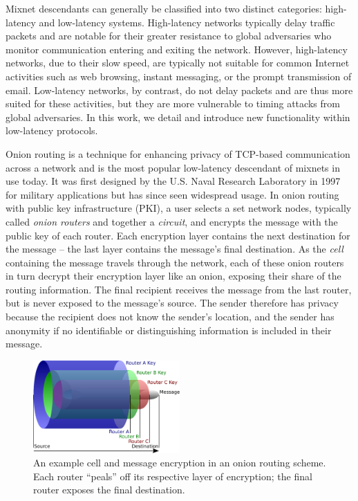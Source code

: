 Mixnet descendants can generally be classified into two distinct categories: high-latency and low-latency systems. High-latency networks typically delay traffic packets and are notable for their greater resistance to global adversaries who monitor communication entering and exiting the network. However, high-latency networks, due to their slow speed, are typically not suitable for common Internet activities such as web browsing, instant messaging, or the prompt transmission of email. Low-latency networks, by contrast, do not delay packets and are thus more suited for these activities, but they are more vulnerable to timing attacks from global adversaries.\cite{dingledine2004tor} In this work, we detail and introduce new functionality within low-latency protocols.

Onion routing is a technique for enhancing privacy of TCP-based communication across a network and is the most popular low-latency descendant of mixnets in use today. It was first designed by the U.S. Naval Research Laboratory in 1997 for military applications\cite{syverson1997anonymous}\cite{reed1998anonymous} but has since seen widespread usage. In onion routing with public key infrastructure (PKI), a user selects a set network nodes, typically called \emph{onion routers} and together a \emph{circuit}, and encrypts the message with the public key of each router. Each encryption layer contains the next destination for the message -- the last layer contains the message's final destination. As the \emph{cell} containing the message travels through the network, each of these onion routers in turn decrypt their encryption layer like an onion, exposing their share of the routing information. The final recipient receives the message from the last router, but is never exposed to the message's source.\cite{syverson2011peel} The sender therefore has privacy because the recipient does not know the sender's location, and the sender has anonymity if no identifiable or distinguishing information is included in their message.

\begin{figure}[htbp]
	\centering
	\includegraphics[width=0.5\textwidth]{images/onion-diagram.eps}
	\caption{An example cell and message encryption in an onion routing scheme. Each router ``peals'' off its respective layer of encryption; the final router exposes the final destination.}
\end{figure}

